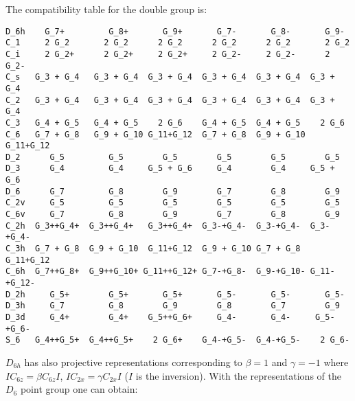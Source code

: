 \documentclass[12pt,a4paper,twoside]{report}
\begin{document}
The compatibility table for the double group is:

\begin{tcolorbox}
\begin{scriptsize}
\begin{verbatim}
D_6h    G_7+         G_8+       G_9+       G_7-       G_8-       G_9-
C_1     2 G_2       2 G_2      2 G_2      2 G_2      2 G_2       2 G_2
C_i     2 G_2+      2 G_2+     2 G_2+     2 G_2-     2 G_2-      2 G_2-
C_s   G_3 + G_4   G_3 + G_4  G_3 + G_4  G_3 + G_4  G_3 + G_4  G_3 + G_4
C_2   G_3 + G_4   G_3 + G_4  G_3 + G_4  G_3 + G_4  G_3 + G_4  G_3 + G_4
C_3   G_4 + G_5   G_4 + G_5    2 G_6    G_4 + G_5  G_4 + G_5    2 G_6
C_6   G_7 + G_8   G_9 + G_10 G_11+G_12  G_7 + G_8  G_9 + G_10 G_11+G_12
D_2      G_5         G_5        G_5        G_5        G_5        G_5
D_3      G_4         G_4     G_5 + G_6     G_4        G_4     G_5 + G_6    
D_6      G_7         G_8        G_9        G_7        G_8        G_9
C_2v     G_5         G_5        G_5        G_5        G_5        G_5
C_6v     G_7         G_8        G_9        G_7        G_8        G_9
C_2h  G_3++G_4+  G_3++G_4+   G_3++G_4+  G_3-+G_4-  G_3-+G_4-  G_3-+G_4- 
C_3h  G_7 + G_8  G_9 + G_10  G_11+G_12  G_9 + G_10 G_7 + G_8  G_11+G_12
C_6h  G_7++G_8+  G_9++G_10+ G_11++G_12+ G_7-+G_8-  G_9-+G_10- G_11-+G_12-
D_2h     G_5+        G_5+       G_5+       G_5-       G_5-       G_5-
D_3h     G_7         G_8        G_9        G_8        G_7        G_9
D_3d     G_4+        G_4+    G_5++G_6+     G_4-       G_4-     G_5-+G_6-
S_6   G_4++G_5+  G_4++G_5+    2 G_6+    G_4-+G_5-  G_4-+G_5-    2 G_6-
\end{verbatim}
\end{scriptsize}
\end{tcolorbox}

$D_{6h}$ has also projective representations corresponding to
$\beta=1$ and $\gamma=-1$ where $IC_{6z} = \beta C_{6z} I$, 
$IC_{2x} = \gamma C_{2x} I$ ($I$ is the inversion). With the 
representations of the $D_6$ point group one can obtain:
\end{document}
